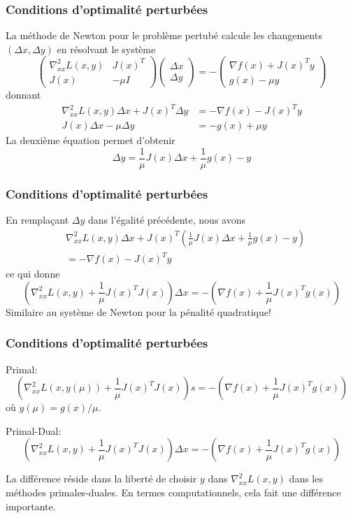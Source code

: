 \documentclass[t,usepdftitle=false,aspectratio=169]{beamer}
\def\blue{\color{blue}}
\begin{document}
\begin{frame}
\frametitle{Conditions d'optimalité perturbées}

La méthode de Newton pour le problème pertubé calcule les changements $(\Delta x, \Delta y)$ en résolvant le système
$$
\begin{pmatrix}
\nabla^2_{xx} L(x, y) & J(x)^T \\
J(x) & -\mu I
\end{pmatrix}
\begin{pmatrix}
\Delta x \\ \Delta y
\end{pmatrix}
=
- \begin{pmatrix}
\nabla f(x) + J(x)^Ty \\ g(x) - \mu y
\end{pmatrix}
$$
donnant
\begin{align*}
\nabla^2_{xx} L(x, y)\Delta x + J(x)^T\Delta y &=  -\nabla f(x) - J(x)^Ty \\
J(x)\Delta x -\mu \Delta y &= -g(x) + \mu y
\end{align*}
La deuxième équation permet d'obtenir
$$
\Delta y = \frac{1}{\mu}J(x)\Delta x + \frac{1}{\mu}g(x) - y
$$

\end{frame}

\begin{frame}
\frametitle{Conditions d'optimalité perturbées}

En remplaçant $\Delta y$ dans l'égalité précédente, nous avons
\begin{align*}
&\nabla^2_{xx} L(x, y)\Delta x + J(x)^T\left( \frac{1}{\mu}J(x)\Delta x + \frac{1}{\mu}g(x) - y \right) \\ &=  -\nabla f(x) - J(x)^Ty
\end{align*}
ce qui donne
$$
\left( \nabla^2_{xx} L(x, y) + \frac{1}{\mu} J(x)^TJ(x) \right) \Delta x = - \left( \nabla f(x) + \frac{1}{\mu} J(x)^T g(x) \right)
$$
Similaire au système de Newton pour la pénalité quadratique!

\end{frame}

\begin{frame}
\frametitle{Conditions d'optimalité perturbées}

{\blue Primal:}
$$
\left( \nabla^2_{xx} L(x, y(\mu)) + \frac{1}{\mu} J(x)^TJ(x) \right) s = - \left( \nabla f(x) + \frac{1}{\mu} J(x)^T g(x) \right)
$$
où $y(\mu) = g(x)/\mu$.

\mbox{}

{\blue Primal-Dual:}
$$
\left( \nabla^2_{xx} L(x, y) + \frac{1}{\mu} J(x)^TJ(x) \right) \Delta x = - \left( \nabla f(x) + \frac{1}{\mu} J(x)^T g(x) \right)
$$

\mbox{}

La différence réside dans la liberté de choisir $y$ dans $\nabla^2_{xx} L(x, y)$ dans les méthodes primales-duales.
En termes computationnels, cela fait une différence importante.

\end{frame}
\end{document}
